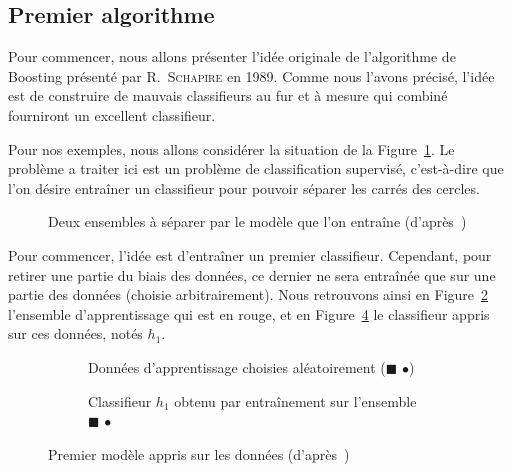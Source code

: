 \subsection{Premier algorithme}
\label{sec:boosting}
Pour commencer, nous allons présenter l'idée originale de l'algorithme de Boosting présenté par R.~\textsc{Schapire} en 1989. Comme nous l'avons précisé, l'idée est de construire de \og mauvais\fg{} classifieurs au fur et à mesure qui combiné fourniront un excellent classifieur.

Pour nos exemples, nous allons considérer la situation de la Figure~\ref{fig:boosting_situation}. Le problème a traiter ici est un problème de classification supervisé, c'est-à-dire que l'on désire entraîner un classifieur pour pouvoir séparer les carrés des cercles.

\begin{figure}[h]
	\begin{margincap}
	  	\centering
		
		\caption[fig:boosting_situation]{Deux ensembles à séparer par le modèle que l'on entraîne (d'après~\cite{bib:elghazel})}
		\label{fig:boosting_situation}
	\end{margincap}
\end{figure}

Pour commencer, l'idée est d'entraîner un premier classifieur. Cependant, pour retirer une partie du biais des données, ce dernier ne sera entraînée que sur une partie des données (choisie arbitrairement). Nous retrouvons ainsi en Figure~\ref{fig:boosting_un_app} l'ensemble d'apprentissage qui est en rouge, et en Figure~\ref{fig:boosting_un_modele} le classifieur appris sur ces données, notés $h_1$.

\begin{figure}[h]
	\begin{margincap}
	\begin{subfigure}{.45\textwidth}
		
		\caption{Données d'apprentissage choisies aléatoirement ($\blacksquare$ \large{$\bullet$})}
		\label{fig:boosting_un_app}
	\end{subfigure}\hfill
	\begin{subfigure}{.45\textwidth}
		
		\caption{Classifieur $h_1$ obtenu par entraînement sur l'ensemble $\blacksquare$ \large{$\bullet$}}
		\label{fig:boosting_un_modele}
	\end{subfigure}\hfill
	\caption{Premier modèle appris sur les données (d'après~\cite{bib:elghazel})}
	\end{margincap}
\end{figure}

